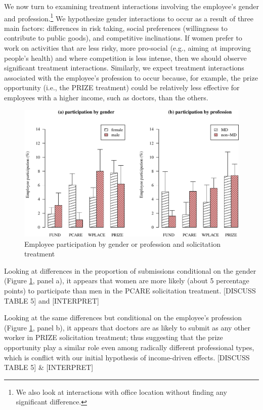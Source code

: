 \documentclass[11pt, titlepage]{article}
\begin{document}
We now turn to examining treatment interactions involving the employee's
gender and profession.\footnote{We also look at interactions with office
  location without finding any significant difference.} We hypothesize
gender interactions to occur as a result of three main factors:
differences in risk taking, social preferences (willingness to
contribute to public goods), and competitive inclinations. If women
prefer to work on activities that are less risky, more pro-social (e.g.,
aiming at improving people's health) and where competition is less
intense, then we should observe significant treatment interactions.
Similarly, we expect treatment interactions associated with the
employee's profession to occur because, for example, the prize
opportunity (i.e., the PRIZE treatment) could be relatively less
effective for employees with a higher income, such as doctors, than the
others.

\begin{figure} 
  \centering
  \caption{Employee participation by gender or profession and solicitation treatment}
  \label{interactions}
  \includegraphics{figures/figure_interactions-1.pdf}
\end{figure}

Looking at differences in the proportion of submissions conditional on
the gender (Figure \ref{interactions}, panel a), it appears that women
are more likely (about 5 percentage points) to participate than men in
the PCARE solicitation treatment. {[}DISCUSS TABLE 5{]} and
{[}INTERPRET{]}

Looking at the same differences but conditional on the employee's
profession (Figure \ref{interactions}, panel b), it appears that doctors
are as likely to submit as any other worker in PRIZE solicitation
treatment; thus suggesting that the prize opportunity play a similar
role even among radically different professional types, which is
conflict with our initial hypothesis of income-driven effects.
{[}DISCUSS TABLE 5{]} \& {[}INTERPRET{]}
\end{document}
